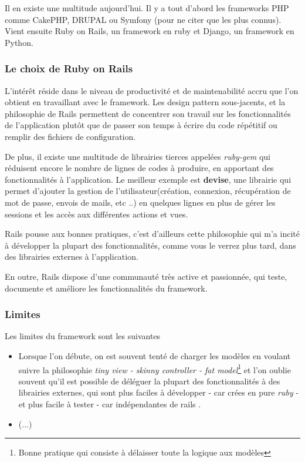 Il en existe une multitude aujourd'hui. Il y a tout d'abord les frameworks PHP comme CakePHP, DRUPAL ou Symfony (pour ne citer que les plus connus). Vient ensuite Ruby on Rails, un framework en ruby et Django, un framework en Python.  
\subsubsection{Le choix de Ruby on Rails}
L'intérêt réside dans le niveau de productivité et de maintenabilité accru que l'on obtient en travaillant avec le framework. Les design pattern sous-jacents, et la philosophie de Rails permettent de concentrer son travail sur les fonctionnalités de l'application plutôt que de passer son temps à écrire du code répétitif ou remplir des fichiers de configuration. 

De plus, il existe une multitude de librairies tierces appelées \textit{ruby-gem} qui réduisent encore le nombre de lignes de codes à produire, en apportant des fonctionnalités à l'application. Le meilleur exemple est \textbf{devise}, une librairie qui permet d'ajouter la gestion de l'utilisateur(création, connexion, récupération de mot de passe, envois de mails, etc ..) en quelques lignes en plus de gérer les sessions et les accès aux différentes actions et vues. 

Rails pousse aux bonnes pratiques, c'est d'ailleurs cette philosophie qui m'a incité à développer la plupart des fonctionnalités, comme vous le verrez plus tard, dans des librairies externes à l'application.


En outre, Rails dispose d'une communauté très active et passionnée, qui teste, documente et améliore les fonctionnalités du framework. 
\subsubsection{Limites}
Les limites du framework sont les suivantes
\begin{itemize}
\item Lorsque l'on débute, on est souvent tenté de charger les modèles en voulant suivre la philosophie \textit{tiny view - skinny controller - fat model}\footnote{Bonne pratique qui consiste à délaisser toute la logique aux modèles} et l'on oublie souvent qu'il est possible de déléguer la plupart des fonctionnalités à des librairies externes, qui sont plus faciles à développer - car crées en pure \textit{ruby} - et plus facile à tester - car indépendantes de rails \cite{fat_models}.

\item (...)
\end{itemize}

